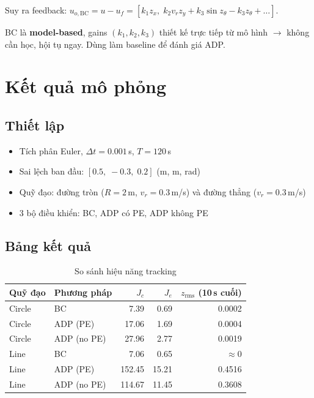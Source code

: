 \documentclass[12pt,a4paper]{article}
\begin{document}
Suy ra feedback: $u_{o,\text{BC}} = u - u_f = [k_1 z_x,\; k_2 v_r z_y + k_3 \sin z_\theta - k_3 z_\theta + \ldots]$.

BC là \textbf{model-based}, gains $(k_1, k_2, k_3)$ thiết kế trực tiếp từ mô hình $\to$ không cần học, hội tụ ngay. Dùng làm baseline để đánh giá ADP.

\section{Kết quả mô phỏng}

\subsection{Thiết lập}

\begin{itemize}[nosep]
    \item Tích phân Euler, $\Delta t = 0.001$\,s, $T = 120$\,s
    \item Sai lệch ban đầu: $[0.5,\; -0.3,\; 0.2]$ (m, m, rad)
    \item Quỹ đạo: đường tròn ($R=2$\,m, $v_r=0.3$\,m/s) và đường thẳng ($v_r=0.3$\,m/s)
    \item 3 bộ điều khiển: BC, ADP có PE, ADP không PE
\end{itemize}

\subsection{Bảng kết quả}

\begin{table}[H]
\centering
\caption{So sánh hiệu năng tracking}
\label{tab:results}
\begin{tabular}{llrrr}
\toprule
\textbf{Quỹ đạo} & \textbf{Phương pháp} & $J_c$ & $J_e$ & $z_{\text{rms}}$ \textbf{(10\,s cuối)} \\
\midrule
Circle & BC          &   7.39 &  0.69 & 0.0002 \\
Circle & ADP (PE)    &  17.06 &  1.69 & 0.0004 \\
Circle & ADP (no PE) &  27.96 &  2.77 & 0.0019 \\
\midrule
Line   & BC          &   7.06 &  0.65 & $\approx 0$ \\
Line   & ADP (PE)    & 152.45 & 15.21 & 0.4516 \\
Line   & ADP (no PE) & 114.67 & 11.45 & 0.3608 \\
\bottomrule
\end{tabular}
\end{table}
\end{document}
